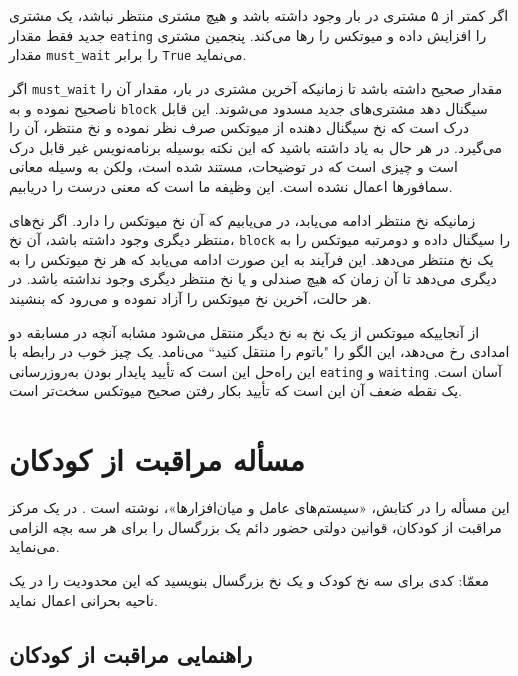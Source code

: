 \documentclass{book}
\newcommand{\clearemptydoublepage}{\newpage\cleardoublepage}
\begin{document}

    اگر کمتر از ۵ مشتری در بار وجود داشته باشد و هیچ مشتری منتظر نباشد، یک مشتری جدید فقط مقدار {\tt eating} را افزایش داده و میوتکس را رها می‌کند. 
    پنجمین مشتری مقدار {\tt must\_wait} را برابر \texttt{True} می‌نماید. 

    اگر {\tt must\_wait} مقدار صحیح داشته باشد تا زمانیکه آخرین مشتری در بار، مقدار آن را ناصحیح نموده و به  {\tt block} سیگنال دهد مشتری‌های جدید 
    مسدود می‌شوند. این قابل درک است که نخ سیگنال دهنده از میوتکس صرف نظر نموده و نخ منتظر، آن را می‌گیرد. در هر حال  به یاد داشته باشید که 
    این نکته بوسیله برنامه‌نویس غیر قابل درک است و چیزی است که در توضیحات، مستند شده است، 
    ولکن به وسیله معانی سمافورها اعمال نشده است. این وظیفه ما است که معنی درست را دریابیم.

    زمانیکه نخ منتظر ادامه می‌یابد، در می‌یابیم که آن نخ میوتکس را دارد. اگر نخ‌های منتظر دیگری وجود داشته باشد، آن نخ، {\tt block} را سیگنال داده و 
    دومرتبه میوتکس را به یک نخ منتظر می‌دهد. این فرآیند به این صورت ادامه می‌یابد که  هر نخ میوتکس را
    به دیگری می‌دهد تا آن زمان که هیچ صندلی و یا نخ منتظر دیگری وجود نداشته باشد. در هر حالت، آخرین نخ میوتکس را آزاد نموده و می‌رود که بنشیند. 
    

    از آنجاییکه میوتکس از یک نخ به نخ دیگر منتقل می‌شود مشابه آنچه در مسابقه دو امدادی رخ می‌دهد، 
    این الگو را "باتوم را منتقل کنید‍‍`` می‌نامد.
    یک چیز خوب در رابطه با این راه‌حل این است که تأیید پایدار بودن به‌روزرسانی  {\tt eating} و {\tt waiting} آسان است. یک نقطه ضعف آن 
    این است که تأیید بکار رفتن صحیح میوتکس سخت‌تر است. 

\section{مسأله مراقبت از کودکان}

    این مسأله را  در کتابش، «سیستم‌های عامل و میان‌افزارها»، نوشته است \cite{hailperin}. 
    در یک مرکز مراقبت از کودکان، قوانین دولتی حضور دائم یک بزرگسال را برای هر سه بچه الزامی می‌نماید. 

    معمّا: کدی برای سه نخ کودک و یک نخ بزرگسال بنویسید که این محدودیت‌ را در یک ناحیه بحرانی اعمال نماید. 

\clearemptydoublepage
\subsection {راهنمایی مراقبت از کودکان}
\end{document}
